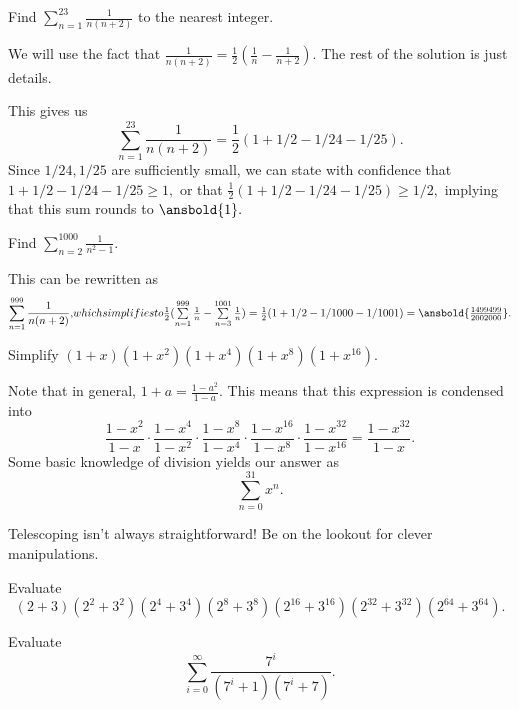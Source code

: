 \documentclass{article}
\begin{document}
\begin{exam}
Find $\sum\limits_{n=1}^{23} \frac{1}{n(n+2)}$ to the nearest integer.
\end{exam}

\begin{sol}
We will use the fact that $\frac{1}{n(n+2)}=\frac{1}{2}(\frac{1}{n}-\frac{1}{n+2}).$ The rest of the solution is just details.

This gives us \[\sum\limits_{n=1}^{23} \frac{1}{n(n+2)}=\frac{1}{2}(1+1/2-1/24-1/25).\] Since $1/24,1/25$ are sufficiently small, we can state with confidence that $1+1/2-1/24-1/25\geq 1,$ or that $\frac{1}{2}(1+1/2-1/24-1/25) \geq 1/2,$ implying that this sum rounds to $\ansbold{1}.$
\end{sol}

\begin{exam}
Find $\sum\limits_{n=2}^{1000} \frac{1}{n^2-1}.$
\end{exam}

\begin{sol}
This can be rewritten as \[\sum\limits_{n=1}^{999}\frac{1}{n(n+2)},$$ which simplifies to $$\frac{1}{2}(\sum\limits_{n=1}^{999}\frac{1}{n}-\sum\limits_{n=3}^{1001}\frac{1}{n})=\frac{1}{2}(1+1/2-1/1000-1/1001)=\ansbold{\frac{1499499}{2002000}}.\]
\end{sol}

\begin{exam}
Simplify $(1+x)(1+x^2)(1+x^4)(1+x^8)(1+x^{16}).$
\end{exam}

\begin{sol}
Note that in general, $1+a=\frac{1-a^2}{1-a}.$ This means that this expression is condensed into \[\frac{1-x^2}{1-x}\cdot \frac{1-x^4}{1-x^2}\cdot \frac{1-x^8}{1-x^4}\cdot \frac{1-x^{16}}{1-x^8} \cdot \frac {1-x^{32}}{1-x^{16}}=\frac{1-{x^{32}}}{1-x}.\] Some basic knowledge of division yields our answer as \[\sum\limits_{n=0}^{31} x^n.\]
\end{sol}

Telescoping isn't always straightforward! Be on the lookout for clever manipulations.

\begin{exer}[AMC 10A 2021/10]
Evaluate
\[(2+3)(2^2+3^2)(2^4+3^4)(2^8+3^8)(2^{16}+3^{16})(2^{32}+3^{32})(2^{64}+3^{64}).\]
\end{exer}

\begin{exer}[CMIMC 2021/T3]
Evaluate \[\sum_{i=0}^{\infty}\frac{7^i}{(7^i+1)(7^i+7)}.\]
\end{exer}
\end{document}
